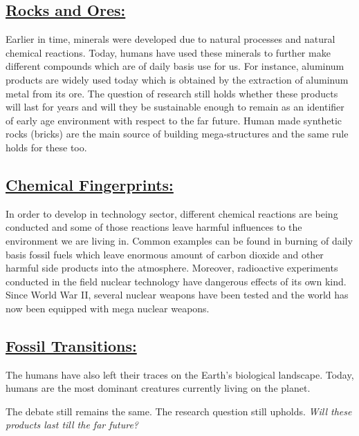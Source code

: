 \documentclass{article}
\begin{document}
\subsection{\underline{Rocks and Ores:}} Earlier in time, minerals were developed due to natural processes and natural chemical reactions. Today, humans have used these minerals to further make different compounds which are of daily basis use for us. For instance, aluminum products are widely used today which is obtained by the extraction of aluminum metal from its ore. The question of research still holds whether these products will last for years and will they be sustainable enough to remain as an identifier of early age environment with respect to the far future. Human made synthetic rocks (bricks) are the main source of building mega-structures and the same rule holds for these too. 
\subsection{\underline{Chemical Fingerprints:}} In order to develop in technology sector, different chemical reactions are being conducted and some of those reactions leave harmful influences to the environment we are living in. Common examples can be found in burning of daily basis fossil fuels which leave enormous amount of carbon dioxide and other harmful side products into the atmosphere. Moreover, radioactive experiments conducted in the field nuclear technology have dangerous effects of its own kind. Since World War II, several nuclear weapons have been tested and the world has now been equipped with mega nuclear weapons. 

\subsection{\underline{Fossil Transitions:}} The humans have also left their traces on the Earth’s biological landscape. Today, humans are the most dominant creatures currently living on the planet. 

The debate still remains the same. The research question still upholds. \textit{Will these products last till the far future?}
\end{document}
